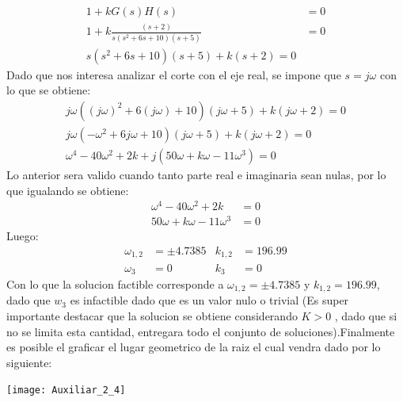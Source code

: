 \documentclass[
  11pt,
  letterpaper,
   addpoints,
   answers
  ]{exam}
\begin{document}
\begin{questions}
\begin{solution}
\begin{align}
    1+kG(s)H(s) &= 0\\
    1+k\frac{(s+2)}{s(s^{2}+6s+10)(s+5)} &= 0\\
    s(s^{2}+6s+10)(s+5)+k(s+2)=0
\end{align}
Dado que nos interesa analizar el corte con el eje real, se impone que $s=j\omega$ con lo que se obtiene:
\begin{align}
    j\omega((j\omega)^{2}+6(j\omega)+10)(j\omega+5)+k(j\omega+2)=0\\
    j\omega( -\omega^{2}+6j\omega+10)(j\omega+5)+k(j\omega+2)=0\\
    \omega^{4}-40\omega^{2}+2k + j(50\omega +k\omega-11\omega^{3})=0
\end{align}
Lo anterior sera valido cuando tanto parte real e imaginaria sean nulas, por lo que igualando se obtiene:
\begin{align}
    \omega^{4}-40\omega^{2}+2k &= 0\\
    50\omega +k\omega-11\omega^{3} &= 0
\end{align}
Luego:
\begin{align}
    \omega_{1,2} &= \pm 4.7385 & k_{1,2}&= 196.99\\
    \omega_{3} &= 0 & k_{3}&= 0
\end{align}
Con lo que la solucion factible corresponde a $\omega_{1,2} = \pm 4.7385$ y $k_{1,2}= 196.99$, dado que $w_{3}$ es infactible dado que es un valor nulo o trivial (Es super importante destacar que la solucion se obtiene considerando $K>0$ , dado que si no se limita esta cantidad, entregara todo el conjunto de soluciones).Finalmente es posible el graficar el lugar geometrico de la raiz el cual vendra dado por lo siguiente:
\begin{center}
    \texttt{[image: Auxiliar\_2\_4]}
  \end{center}

\end{solution}
\end{questions}
\end{document}
